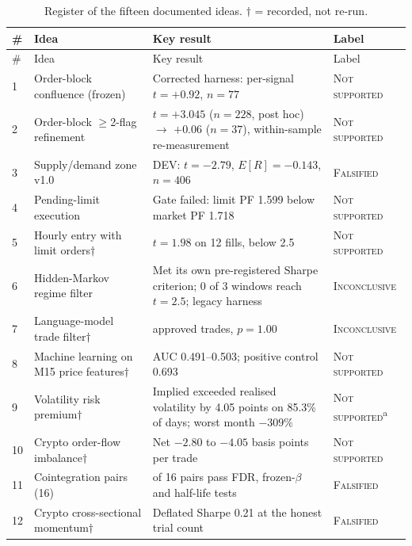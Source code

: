 \documentclass[11pt,a4paper]{article}
\newcommand{\R}{\ensuremath{R}}
\begin{document}
{\small
\begin{longtable}{@{}p{0.45cm}>{\raggedright\arraybackslash}p{3.6cm}>{\raggedright\arraybackslash}p{6.15cm}>{\raggedright\arraybackslash}p{3.0cm}@{}}
\caption{Register of the fifteen documented ideas. $\dagger$ = recorded, not re-run.}\label{tab:ideas}\\
\toprule
\# & Idea & Key result & Label \\
\midrule
\endfirsthead
\toprule
\# & Idea & Key result & Label \\
\midrule
\endhead
1 & Order-block confluence (frozen) & Corrected harness: per-signal $t=+0.92$, $n=77$ & \textsc{Not supported} \\ %
2 & Order-block $\geq$2-flag refinement & $t=+3.045$ ($n=228$, post hoc) $\rightarrow$ $+0.06$ ($n=37$), within-sample re-measurement & \textsc{Not supported} \\ %
3 & Supply/demand zone v1.0 & DEV: $t=-2.79$, $E[\R]=-0.143$, $n=406$ & \textsc{Falsified} \\ %
4 & Pending-limit execution & Gate failed: limit PF 1.599 below market PF 1.718 & \textsc{Not supported} \\ %
5 & Hourly entry with limit orders$\dagger$ & $t=1.98$ on 12 fills, below 2.5 & \textsc{Not supported} \\ %
6 & Hidden-Markov regime filter & Met its own pre-registered Sharpe criterion; 0 of 3 windows reach $t=2.5$; legacy harness & \textsc{Inconclusive} \\ %
7 & Language-model trade filter$\dagger$ & 11 approved trades, $p=1.00$ & \textsc{Inconclusive} \\ %
8 & Machine learning on M15 price features$\dagger$ & AUC 0.491--0.503; positive control 0.693 & \textsc{Not supported} \\ %
9 & Volatility risk premium$\dagger$ & Implied exceeded realised volatility by 4.05 points on 85.3\% of days; worst month $-309\%$ & \textsc{Not supported}\textsuperscript{a} \\ %
10 & Crypto order-flow imbalance$\dagger$ & Net $-2.80$ to $-4.05$ basis points per trade & \textsc{Not supported} \\ %
11 & Cointegration pairs (16) & 0 of 16 pairs pass FDR, frozen-$\beta$ and half-life tests & \textsc{Falsified} \\ %
12 & Crypto cross-sectional momentum$\dagger$ & Deflated Sharpe 0.21 at the honest trial count & \textsc{Falsified} \\ %

\end{longtable}}
\end{document}

